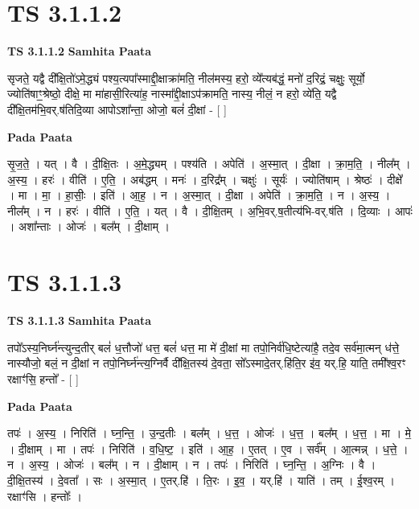 \documentclass[17pt]{extarticle}
\begin{document}
\section{ TS 3.1.1.2 }

\textbf{TS 3.1.1.2 } \newline
\textbf{Samhita Paata} \newline

सृजते॒ यद्वै दी᳚क्षि॒तो॑ऽमे॒द्ध्यं पश्य॒त्यपा᳚स्माद्दी॒क्षाक्रा॑मति॒ नील॑मस्य॒ हरो॒ व्ये᳚त्यब॑द्धं॒ मनो॑ द॒रिद्रं॒ चक्षुः॒ सूर्यो॒ ज्योति॑षाꣳ॒॒श्रेष्ठो॒ दीक्षे॒ मा मा॑हासी॒रित्या॑ह॒ नास्मा᳚द्दी॒क्षाऽप॑क्रामति॒ नास्य॒ नीलं॒ न हरो॒ व्ये॑ति॒ यद्वै दी᳚क्षि॒तम॑भि॒वर्.ष॑तिदि॒व्या आपोऽशा᳚न्ता॒ ओजो॒ बलं॑ दी॒क्षां - [  ] \newline

\textbf{Pada Paata} \newline

सृ॒ज॒ते॒ । यत् । वै । दी॒क्षि॒तः । अ॒मे॒द्ध्यम् । पश्य॑ति । अपेति॑ । अ॒स्मा॒त् । दी॒क्षा । क्रा॒म॒ति॒ । नील᳚म् । अ॒स्य॒ । हरः॑ । वीति॑ । ए॒ति॒ । अब॑द्धम् । मनः॑ । द॒रिद्र᳚म् । चक्षुः॑ । सूर्यः॑ । ज्योति॑षाम् । श्रेष्ठः॑ । दीक्षे᳚ । मा । मा॒ । हा॒सीः॒ । इति॑ । आ॒ह॒ । न । अ॒स्मा॒त् । दी॒क्षा । अपेति॑ । क्रा॒म॒ति॒ । न । अ॒स्य॒ । नील᳚म् । न । हरः॑ । वीति॑ । ए॒ति॒ । यत् । वै । दी॒क्षि॒तम् । अ॒भि॒वर्.ष॒तीत्य॑भि-वर्.ष॑ति । दि॒व्याः । आपः॑ । अशा᳚न्ताः । ओजः॑ । बल᳚म् । दी॒क्षाम् ।  \newline





\section{ TS 3.1.1.3 }

\textbf{TS 3.1.1.3 } \newline
\textbf{Samhita Paata} \newline

तपो᳚ऽस्य॒निर्घ्न॑न्त्युन्द॒तीर् बलं॑ ध॒त्तौजो॑ धत्त॒ बलं॑ धत्त॒ मा मे॑ दी॒क्षां मा तपो॒निर्व॑धि॒ष्टेत्या॑है॒ तदे॒व सर्व॑मा॒त्मन् ध॑त्ते॒ नास्यौजो॒ बलं॒ न दी॒क्षां न तपो॒निर्घ्न॑न्त्य॒ग्निर्वै दी᳚क्षि॒तस्य॑ दे॒वता॒ सो᳚ऽस्मादे॒तर्.हि॑ति॒र इ॑व॒ यर्.हि॒ याति॒ तमी᳚श्व॒रꣳ रक्षाꣳ॑सि॒ हन्तो᳚ -  [  ] \newline

\textbf{Pada Paata} \newline

तपः॑ । अ॒स्य॒ । निरिति॑ । घ्न॒न्ति॒ । उ॒न्द॒तीः । बल᳚म् । ध॒त्त॒ । ओजः॑ । ध॒त्त॒ । बल᳚म् । ध॒त्त॒ । मा । मे॒ । दी॒क्षाम् । मा । तपः॑ । निरिति॑ । व॒धि॒ष्ट॒ । इति॑ । आ॒ह॒ । ए॒तत् । ए॒व । सर्व᳚म् । आ॒त्मन्न् । ध॒त्ते॒ । न । अ॒स्य॒ । ओजः॑ । बल᳚म् । न । दी॒क्षाम् । न । तपः॑ । निरिति॑ । घ्न॒न्ति॒ । अ॒ग्निः । वै । दी॒क्षि॒तस्य॑ । दे॒वता᳚ । सः । अ॒स्मा॒त् । ए॒तर्.हि॑ । ति॒रः । इ॒व॒ । यर्.हि॑ । याति॑ । तम् । ई॒श्व॒रम् । रक्षाꣳ॑सि । हन्तोः᳚ ।  \newline
\end{document}
